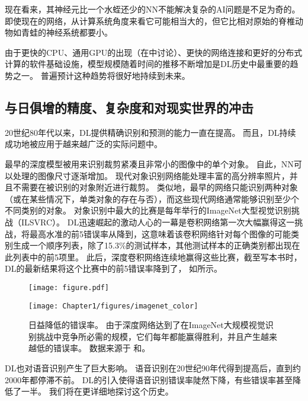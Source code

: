现在看来，其神经元比一个水蛭还少的\gls{NN}不能解决复杂的\gls{AI}问题是不足为奇的。
即使现在的网络，从计算系统角度来看它可能相当大的，但它比相对原始的脊椎动物如青蛙的神经系统都要小。

由于更快的CPU、通用GPU的出现（在中讨论）、更快的网络连接和更好的分布式计算的软件基础设施，模型规模随着时间的推移不断增加是\gls{DL}历史中最重要的趋势之一。
普遍预计这种趋势将很好地持续到未来。


\subsection{与日俱增的精度、复杂度和对现实世界的冲击}
\label{sec:increasing_accuracy_complexity_and_real_world_impact}

20世纪80年代以来，\gls{DL}提供精确识别和预测的能力一直在提高。
而且，\gls{DL}持续成功地被应用于越来越广泛的实际问题中。

最早的深度模型被用来识别裁剪紧凑且非常小的图像中的单个对象\citep{Rumelhart86}。
自此，\gls{NN}可以处理的图像尺寸逐渐增加。
现代对象识别网络能处理丰富的高分辨率照片，并且不需要在被识别的对象附近进行裁剪\citep{Krizhevsky-2012}。
类似地，最早的网络只能识别两种对象（或在某些情况下，单类对象的存在与否），而这些现代网络通常能够识别至少个不同类别的对象。
对象识别中最大的比赛是每年举行的ImageNet大型视觉识别挑战（ILSVRC）。
\gls{DL}迅速崛起的激动人心的一幕是卷积网络第一次大幅赢得这一挑战，将最高水准的前5错误率从降到\citep{Krizhevsky-2012}，这意味着该卷积网络针对每个图像的可能类别生成一个顺序列表，除了15.3\%的测试样本，其他测试样本的正确类别都出现在此列表中的前5项里。
此后，深度卷积网络连续地赢得这些比赛，截至写本书时，\gls{DL}的最新结果将这个比赛中的前5错误率降到了， 如所示。

\begin{figure}[!htb]
\ifOpenSource
\centerline{\texttt{[image: figure.pdf]}}
\else
\centerline{\texttt{[image: Chapter1/figures/imagenet\_color]}}
\fi
\caption{日益降低的错误率。
由于深度网络达到了在ImageNet大规模视觉识别挑战中竞争所必需的规模，它们每年都能赢得胜利，并且产生越来越低的错误率。
数据来源于 \citet{russakovsky2014imagenet}和\citet{He-et-al-arxiv2015}。}
\label{fig:chap1_imagenet_color}
\end{figure}


\gls{DL}也对语音识别产生了巨大影响。
语音识别在20世纪90年代得到提高后，直到约2000年都停滞不前。
\gls{DL}的引入\citep{dahl2010phonerec,Deng-2010,Seide2011,Hinton-et-al-2012}使得语音识别错误率陡然下降，有些错误率甚至降低了一半。
我们将在更详细地探讨这个历史。

